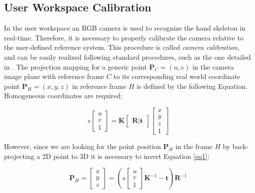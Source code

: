 \documentclass[letterpaper, 10 pt, conference]{ieeeconf}  %
\begin{document}
\subsection{User Workspace Calibration}
In the user workspace an RGB camera is used to recognize the hand skeleton in real-time. Therefore, it is necessary to properly calibrate the camera relative to the user-defined reference system. This procedure is called \textit{camera calibration}, and can be easily realized following standard procedures, such as the one detailed in \cite{MatlabCameraCalib}.
The projection mapping for a generic point $\mathbf{P}_{C} = (u,v)$ in the camera image plane with reference frame $C$ to its corresponding real world coordinate point $\mathbf{P}_{H} = (x,y,z)$ in reference frame $H$ is defined by the following Equation. Homogeneous coordinates are required:

\begin{equation}
s 
\begin{bmatrix}
u \\
v \\
1
\end{bmatrix}
=
\mathbf{K}
\begin{bmatrix}
\mathbf{R} | \mathbf{t}
\end{bmatrix}
\begin{bmatrix}
x \\
y \\
z \\
1
\end{bmatrix}
\label{eq1}
\end{equation}

However, since we are looking for the point position $\mathbf{P}_H$ in the frame $H$ by back-projecting a 2D point to 3D it is necessary to invert Equation \ref{eq1}:

\begin{equation}
\mathbf{P}_{H} = \begin{bmatrix}
x \\
y \\
z
\end{bmatrix}=
\left(s 
\begin{bmatrix}
u \\
v \\
1
\end{bmatrix}
\mathbf{K}^{-1}-\mathbf{t}\right)\mathbf{R}^{-1}
\label{eq2}
\end{equation}
\end{document}
